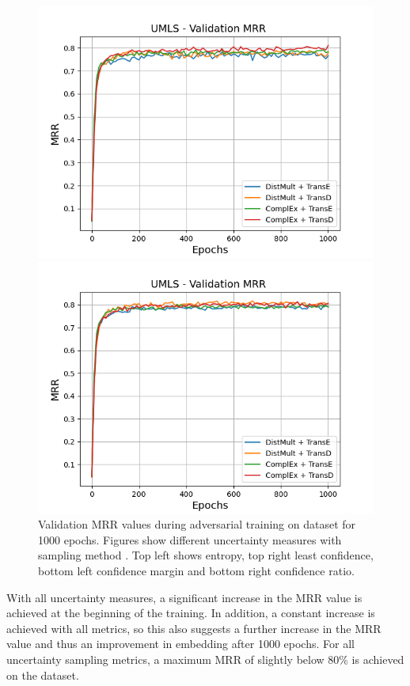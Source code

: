 \begin{figure}[H]
\begin{minipage}{.5\textwidth}
    \end{minipage}
    \begin{minipage}{.5\textwidth}
      \centering
      \includegraphics[width=0.9\linewidth]{figures/results/gan_train/not_pretrained/uncertainty/max_distribution/confidence_margin/umls/uncertainty_umls_mrrs.png}
    \end{minipage}%
    \begin{minipage}{.5\textwidth}
      \centering
      \includegraphics[width=0.9\linewidth]{figures/results/gan_train/not_pretrained/uncertainty/max_distribution/confidence_ratio/umls/uncertainty_umls_mrrs.png}
    \end{minipage}%
    \caption{Validation MRR values during adversarial training on \umls dataset for 1000 epochs. 
    Figures show different uncertainty measures with sampling method  \ussoftmax.
    Top left shows entropy, top right least confidence, 
    bottom left confidence margin and bottom right confidence ratio.}
    \label{fig:advtrain_metrics_umls}
\end{figure}
With all uncertainty measures, a significant increase in the MRR value is achieved at the beginning of the training.
In addition, a constant increase is achieved with all metrics, so this also suggests a further increase in the MRR value and thus an improvement in embedding after 1000 epochs.
For all uncertainty sampling metrics, a maximum MRR of slightly below 80\% is achieved on the \umls dataset.


